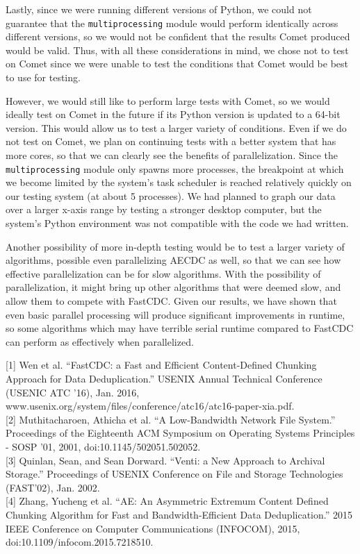 \documentclass{acmtog} %
\begin{document}
	Lastly, since we were running different versions of Python, we could not guarantee that the \texttt{multiprocessing} module would perform identically across different versions, so we would not be confident that the results Comet produced would be valid. Thus, with all these considerations in mind, we chose not to test on Comet since we were unable to test the conditions that Comet would be best to use for testing.
	
	However, we would still like to perform large tests with Comet, so we would ideally test on Comet in the future if its Python version is updated to a 64-bit version. This would allow us to test a larger variety of conditions. Even if we do not test on Comet, we plan on continuing tests with a better system that has more cores, so that we can clearly see the benefits of parallelization. Since the \texttt{multiprocessing} module only spawns more processes, the breakpoint at which we become limited by the system's task scheduler is reached relatively quickly on our testing system (at about 5 processes). We had planned to graph our data over a larger x-axis range by testing a stronger desktop computer, but the system's Python environment was not compatible with the code we had written.
	
	Another possibility of more in-depth testing would be to test a larger variety of algorithms, possible even parallelizing AECDC as well, so that we can see how effective parallelization can be for slow algorithms. With the possibility of parallelization, it might bring up other algorithms that were deemed slow, and allow them to compete with FastCDC. Given our results, we have shown that even basic parallel processing will produce significant improvements in runtime, so some algorithms which may have terrible serial runtime compared to FastCDC can perform as effectively when parallelized. 
	  \begin{thebibliography}{1}
	  
	   [1] Wen et al. “FastCDC: a Fast and Efficient Content-Defined Chunking Approach for Data Deduplication.” USENIX Annual Technical Conference (USENIC ATC ’16), Jan. 2016, www.usenix.org/system/files/conference/atc16/atc16-paper-xia.pdf. \\

	   [2] Muthitacharoen, Athicha et al. “A Low-Bandwidth Network File System.” Proceedings of the Eighteenth ACM Symposium on Operating Systems Principles - SOSP '01, 2001, doi:10.1145/502051.502052. \\

	   [3] Quinlan, Sean, and Sean Dorward. “Venti: a New Approach to Archival Storage.” Proceedings of USENIX Conference on File and Storage Technologies (FAST’02), Jan. 2002. \\

	   [4] Zhang, Yucheng et al. “AE: An Asymmetric Extremum Content Defined Chunking Algorithm for Fast and Bandwidth-Efficient Data Deduplication.” 2015 IEEE Conference on Computer Communications (INFOCOM), 2015, doi:10.1109/infocom.2015.7218510. \\

	  \end{thebibliography}

	
		
	
\end{document}

